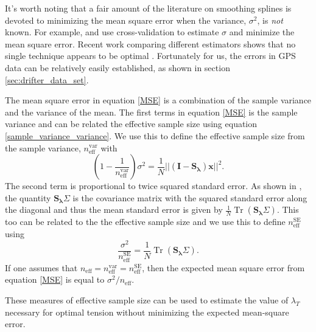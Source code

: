 \documentclass[10pt,journal]{IEEEtran}
\DeclareMathOperator{\Tr}{Tr}
\begin{document}
It's worth noting that a fair amount of the literature on smoothing splines is devoted to minimizing the mean square error when the variance, $\sigma^2$, is \emph{not} known. For example, \cite{wahba1978-jrss-b} and \cite{craven1979-nm} use cross-validation to estimate $\sigma$ and minimize the mean square error. Recent work comparing different estimators shows that no single technique appears to be optimal \cite{lee2003-csda}. Fortunately for us, the errors in GPS data can be relatively easily established, as shown in section \ref{sec:drifter_data_set}.

The mean square error in equation \ref{MSE} is a combination of the sample variance and the variance of the mean. The first terms in equation \ref{MSE} is the sample variance and can be related the effective sample size using equation \ref{sample_variance_variance}. We use this to define the effective sample size from the sample variance, $n_{\textrm{eff}}^{\textrm{var}}$ with
\begin{equation}
\label{dof_var}
    \left(1-\frac{1}{n_{\textrm{eff}}^{\textrm{var}}} \right)\sigma^2 = \frac{1}{N} || \left( \mathbf{I} - \mathbf{S_\lambda} \right) \mathbf{x} ||^2.
\end{equation}
The second term is proportional to twice squared standard error. As shown in \cite{teanby2007-mg}, the quantity $\mathbf{S_\lambda} \Sigma$ is the covariance matrix with the squared standard error along the diagonal and thus the mean standard error is given by $\frac{1}{N} \Tr \left( \mathbf{S_\lambda} \Sigma \right)$. This too can be related to the the effective sample size and we use this to define $n_{\textrm{eff}}^{\textrm{SE}}$ using
\begin{equation}
\label{dof_se}
    \frac{\sigma^2}{n_{\textrm{eff}}^{\textrm{SE}}} = \frac{1}{N} \Tr \left( \mathbf{S_\lambda} \Sigma \right).
\end{equation}
If one assumes that $n_{\textrm{eff}} = n_{\textrm{eff}}^{\textrm{var}} = n_{\textrm{eff}}^{\textrm{SE}}$, then the expected mean square error from equation \ref{MSE} is equal to $\sigma^2/n_{\textrm{eff}}$.

These measures of effective sample size can be used to estimate the value of $\lambda_T$ necessary for optimal tension without minimizing the expected mean-square error. 
\end{document}
